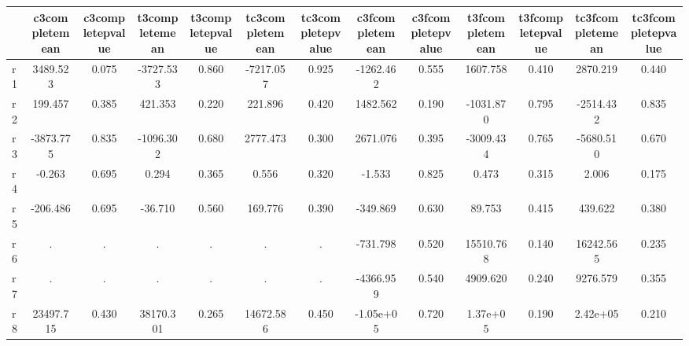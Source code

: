 \begin{table}[htbp]
\begin{tabular}{lcccccccccccc} \hline \hline
 & c3completemean  & c3completepvalue  & t3completemean  & t3completepvalue  & tc3completemean  & tc3completepvalue  & c3fcompletemean  & c3fcompletepvalue  & t3fcompletemean  & t3fcompletepvalue  & tc3fcompletemean  & tc3fcompletepvalue  \\  \hline 
r1 &  3489.523 &     0.075 & -3727.533 &     0.860 & -7217.057 &     0.925 & -1262.462 &     0.555 &  1607.758 &     0.410 &  2870.219 &     0.440 \\  
r2 &   199.457 &     0.385 &   421.353 &     0.220 &   221.896 &     0.420 &  1482.562 &     0.190 & -1031.870 &     0.795 & -2514.432 &     0.835 \\  
r3 & -3873.775 &     0.835 & -1096.302 &     0.680 &  2777.473 &     0.300 &  2671.076 &     0.395 & -3009.434 &     0.765 & -5680.510 &     0.670 \\  
r4 &    -0.263 &     0.695 &     0.294 &     0.365 &     0.556 &     0.320 &    -1.533 &     0.825 &     0.473 &     0.315 &     2.006 &     0.175 \\  
r5 &  -206.486 &     0.695 &   -36.710 &     0.560 &   169.776 &     0.390 &  -349.869 &     0.630 &    89.753 &     0.415 &   439.622 &     0.380 \\  
r6 &         . &         . &         . &         . &         . &         . &  -731.798 &     0.520 & 15510.768 &     0.140 & 16242.565 &     0.235 \\  
r7 &         . &         . &         . &         . &         . &         . & -4366.959 &     0.540 &  4909.620 &     0.240 &  9276.579 &     0.355 \\  
r8 & 23497.715 &     0.430 & 38170.301 &     0.265 & 14672.586 &     0.450 & -1.05e+05 &     0.720 &  1.37e+05 &     0.190 &  2.42e+05 &     0.210 \\  
\hline \hline \end{tabular}
\end{table}

